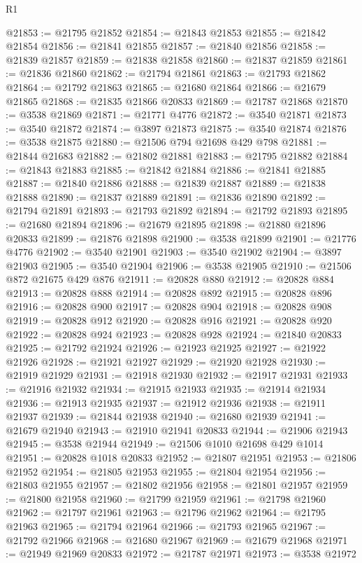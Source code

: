 \begin{lexlean}{R1}
\begin{coremodule}
@21853 := @21795 @21852
@21854 := @21843 @21853
@21855 := @21842 @21854
@21856 := @21841 @21855
@21857 := @21840 @21856
@21858 := @21839 @21857
@21859 := @21838 @21858
@21860 := @21837 @21859
@21861 := @21836 @21860
@21862 := @21794 @21861
@21863 := @21793 @21862
@21864 := @21792 @21863
@21865 := @21680 @21864
@21866 := @21679 @21865
@21868 := @21835 @21866 @20833
@21869 := @21787 @21868
@21870 := @3538 @21869
@21871 := @21771 @4776
@21872 := @3540 @21871
@21873 := @3540 @21872
@21874 := @3897 @21873
@21875 := @3540 @21874
@21876 := @3538 @21875
@21880 := @21506 @794 @21698 @429 @798
@21881 := @21844 @21683
@21882 := @21802 @21881
@21883 := @21795 @21882
@21884 := @21843 @21883
@21885 := @21842 @21884
@21886 := @21841 @21885
@21887 := @21840 @21886
@21888 := @21839 @21887
@21889 := @21838 @21888
@21890 := @21837 @21889
@21891 := @21836 @21890
@21892 := @21794 @21891
@21893 := @21793 @21892
@21894 := @21792 @21893
@21895 := @21680 @21894
@21896 := @21679 @21895
@21898 := @21880 @21896 @20833
@21899 := @21876 @21898
@21900 := @3538 @21899
@21901 := @21776 @4776
@21902 := @3540 @21901
@21903 := @3540 @21902
@21904 := @3897 @21903
@21905 := @3540 @21904
@21906 := @3538 @21905
@21910 := @21506 @872 @21675 @429 @876
@21911 := @20828 @880
@21912 := @20828 @884
@21913 := @20828 @888
@21914 := @20828 @892
@21915 := @20828 @896
@21916 := @20828 @900
@21917 := @20828 @904
@21918 := @20828 @908
@21919 := @20828 @912
@21920 := @20828 @916
@21921 := @20828 @920
@21922 := @20828 @924
@21923 := @20828 @928
@21924 := @21840 @20833
@21925 := @21792 @21924
@21926 := @21923 @21925
@21927 := @21922 @21926
@21928 := @21921 @21927
@21929 := @21920 @21928
@21930 := @21919 @21929
@21931 := @21918 @21930
@21932 := @21917 @21931
@21933 := @21916 @21932
@21934 := @21915 @21933
@21935 := @21914 @21934
@21936 := @21913 @21935
@21937 := @21912 @21936
@21938 := @21911 @21937
@21939 := @21844 @21938
@21940 := @21680 @21939
@21941 := @21679 @21940
@21943 := @21910 @21941 @20833
@21944 := @21906 @21943
@21945 := @3538 @21944
@21949 := @21506 @1010 @21698 @429 @1014
@21951 := @20828 @1018 @20833
@21952 := @21807 @21951
@21953 := @21806 @21952
@21954 := @21805 @21953
@21955 := @21804 @21954
@21956 := @21803 @21955
@21957 := @21802 @21956
@21958 := @21801 @21957
@21959 := @21800 @21958
@21960 := @21799 @21959
@21961 := @21798 @21960
@21962 := @21797 @21961
@21963 := @21796 @21962
@21964 := @21795 @21963
@21965 := @21794 @21964
@21966 := @21793 @21965
@21967 := @21792 @21966
@21968 := @21680 @21967
@21969 := @21679 @21968
@21971 := @21949 @21969 @20833
@21972 := @21787 @21971
@21973 := @3538 @21972

\end{coremodule}
\end{lexlean}
